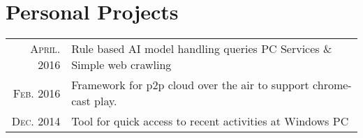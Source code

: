 \documentclass[a4paper,10pt]{article}
\begin{document}
\section{Personal Projects}
\begin{tabular}{rl}

\textsc{April.} 2016 & Rule based AI model handling queries PC Services \& Simple web crawling \\
\textsc{Feb.} 2016 & Framework for p2p cloud over the air to support chrome-cast play. \\
\textsc{Dec.} 2014 & Tool for quick access to recent activities at Windows PC\\


\end{tabular}
\end{document}
